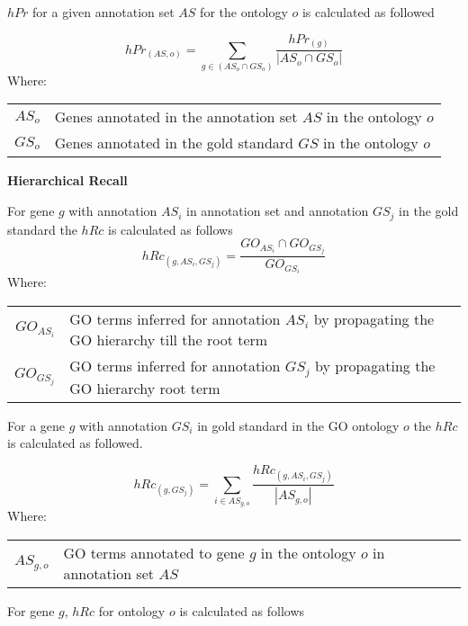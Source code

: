 $hPr$ for a given annotation set $AS$ for the ontology $o$ is calculated as followed

\begin{equation}
    hPr_{(AS,o)} =  \sum_{g \in (AS_{o} \cap GS_{o})}
    \frac{  hPr_{(g)}}
        {|AS_{o} \cap GS_{o}|}
\end{equation}
Where:

\begin{tabularx}{0.95\textwidth}{r@{\ :\ }X}
    $AS_{o}$ & Genes annotated in the annotation set $AS$ in the ontology $o$ \\
    $GS_{o}$ & Genes annotated in the gold standard $GS$ in the ontology $o$
\end{tabularx}

\newpage


\textbf{Hierarchical Recall}

For gene $g$ with annotation $AS_i$ in annotation set and annotation $GS_j$ in the gold standard the $hRc$ is calculated as follows
\begin{equation}
    hRc_{(g,AS_{i},GS_{j})} = \frac{GO_{AS_{i}} \cap GO_{GS_{j}}} {GO_{GS_{i}}}
\end{equation}
Where:

\begin{tabularx}{0.95\textwidth}{r@{\ :\ }X}
    $GO_{AS_{i}}$ & GO terms inferred for annotation $AS_i$ by propagating the GO hierarchy till the root term  \\
    $GO_{GS_{j}}$ & GO terms inferred for annotation $GS_j$ by propagating the GO hierarchy root term
\end{tabularx}

For a gene $g$ with annotation $GS_i$ in gold standard in the GO ontology $o$ the $hRc$ is calculated as followed.

\begin{equation}
    hRc_{(g,GS_{j})} = \sum_{i \in AS_{g,o}} 
    \frac{ hRc_{(g,AS_{i},GS_{j})}}
        {|AS_{g,o}|}
\end{equation}
Where:

\begin{tabularx}{0.95\textwidth}{r@{\ :\ }X}
    $AS_{g,o}$ & GO terms annotated to gene $g$ in the ontology $o$ in annotation set $AS$
\end{tabularx}

For gene $g$, $hRc$ for ontology $o$ is calculated as follows


